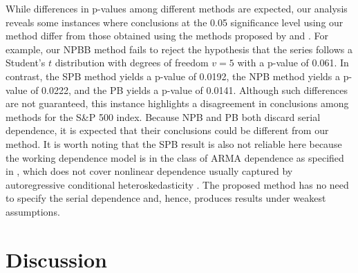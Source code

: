 \documentclass[12pt]{article}
\newcommand{\jy}[1]{\textcolor{red}{JY: #1}}
\newcommand{\eds}[1]{\textcolor{blue}{(EDS: #1)}}
\begin{document}
While differences in p-values among different methods are expected, our analysis
reveals some instances where conclusions at the 0.05 significance level
using our method differ from those obtained using the methods proposed by
\citet{babu2004goodness} and \citet{zeimbekakis2024misuses}.
For example, our NPBB method fails to reject the
hypothesis that the series follows a Student's $t$ distribution with degrees of
freedom $v = 5$ with a p-value of 0.061. In contrast,
the SPB method yields a p-value of 0.0192,
the NPB method yields a p-value of 0.0222, and the PB yields a p-value of
0.0141. Although such differences are not guaranteed, this
instance highlights a disagreement in conclusions among methods for the S\&P 500
index. Because NPB and PB both discard serial dependence, it is expected that
their conclusions could be different from our method. It is worth noting that
the SPB result is also not reliable here because the working dependence model is
in the class of ARMA dependence as specified in \citet{zeimbekakis2024misuses},
which does not cover nonlinear dependence usually captured by autoregressive
conditional heteroskedasticity \citep{engle1995arch}. The proposed method has
no need to specify the serial dependence and, hence, produces results under
weakest assumptions.


\section{Discussion}\label{sec:conclusion}
\end{document}
